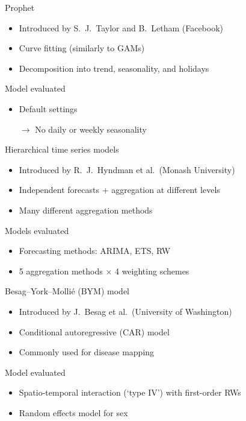 \documentclass[12pt,aspectratio=169]{beamer}
\begin{document}
\begin{frame}{Prophet}
    \begin{itemize}
        \item Introduced by S.\ J.\ Taylor​​ and B.\ Letham​ (Facebook)
        \item Curve fitting (similarly to GAMs)
        \item Decomposition into trend, seasonality, and holidays
    \end{itemize}
    \vfill
    \begin{block}{Model evaluated}
        \begin{itemize}
            \item Default settings
            \item[$\rightarrow$] No daily or weekly seasonality
        \end{itemize}
    \end{block}
\end{frame}

\begin{frame}{Hierarchical time series models}
    \begin{itemize}
        \item Introduced by R.\ J.\ Hyndman et al.\ (Monash University)
        \item Independent forecasts + aggregation at different levels
        \item Many different aggregation methods
    \end{itemize}
    \vfill
    \begin{block}{Models evaluated}
        \begin{itemize}
            \item Forecasting methods: ARIMA, ETS, RW
            \item 5 aggregation methods $\times$ 4 weighting schemes
        \end{itemize}
    \end{block}
\end{frame}

\begin{frame}{Besag--York--Mollié (BYM) model}
    \begin{itemize}
        \item Introduced by J.\ Besag et al.\ (University of Washington)
        \item Conditional autoregressive (CAR) model
        \item Commonly used for disease mapping
    \end{itemize}
    \vfill
    \begin{block}{Model evaluated}
        \begin{itemize}
            \item Spatio\hyp{}temporal interaction (`type IV') with
                  first\hyp{}order RWs
            \item Random effects model for sex
        \end{itemize}
    \end{block}
\end{frame}
\end{document}
